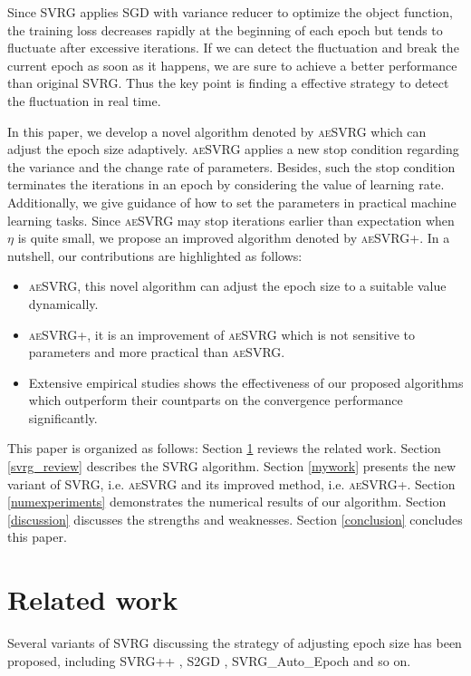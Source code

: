 \documentclass[conference]{IEEEtran}
\begin{document}
Since SVRG applies SGD with variance reducer to optimize the object function, the training loss decreases rapidly at the beginning of each epoch but tends to fluctuate after excessive iterations. If we can detect the fluctuation and break the current epoch as soon as it happens, we are sure to achieve a better performance than original SVRG. Thus the key point is finding a effective strategy to detect the fluctuation in real time.

In this paper, we develop a novel algorithm denoted by \textsc{aeSVRG} which can adjust the epoch size adaptively.  \textsc{aeSVRG} applies a new stop condition regarding the variance and the change rate of parameters. Besides, such the stop condition terminates the iterations in an epoch by considering the value of learning rate.  Additionally, we give guidance of how to set the parameters in practical machine learning tasks. Since \textsc{aeSVRG} may stop iterations earlier than expectation when $\eta$ is quite small, we propose an improved algorithm denoted by \textsc{aeSVRG+}. In a nutshell, our contributions are highlighted as follows:
\begin {itemize}
\item \textsc{aeSVRG}, this novel algorithm can adjust the epoch size to a suitable value dynamically.
\item \textsc{aeSVRG+}, it is an improvement of \textsc{aeSVRG} which is not sensitive to parameters and more practical than \textsc{aeSVRG}.
\item Extensive empirical studies shows the effectiveness of our proposed algorithms which outperform their countparts on the convergence performance significantly.
\end {itemize}
This paper is organized as follows: Section \ref{sectiove_related_work} reviews the related work. Section \ref{svrg_review} describes the SVRG algorithm. Section \ref{mywork} presents the new variant of SVRG, i.e. \textsc{aeSVRG} and its improved method, i.e. \textsc{aeSVRG+}. Section \ref{numexperiments} demonstrates the numerical results of our algorithm. Section \ref{discussion} discusses the strengths and weaknesses.
Section \ref{conclusion} concludes this paper.



\section{Related work}
\label{sectiove_related_work}
Several variants of SVRG  discussing the strategy of adjusting epoch size has been proposed, including SVRG++ \citep{Allen2015Improved}, S2GD \citep{Richtarik:2013te}, SVRG\_Auto\_Epoch \citep{Allen2015Improved} and so on. 
\end{document}
